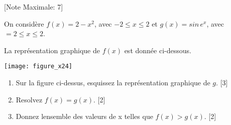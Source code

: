 \begin{question}
  \hspace*{\fill} [Note Maximale: 7]\par
  \medskip
  \noindent On considère $f(x) = 2 - x^2$, avec $-2 \le x \le 2$ et $g(x)= sin\,e^x$, avec $=2 \le x \le 2$.\par
  \medskip
  \begin{center} %
    \noindent La représentation graphique de $f(x)$ est donnée ci-dessous.\par
    \texttt{[image: figure\_x24]}\par
  \end{center} %
  \begin{enumerate}[label=(\alph*)]
    \item Sur la figure ci-dessus, esquissez la représentation graphique de $g$.\hspace*{\fill} [3]
    \item Resolvez $f(x) = g(x)$.\hspace*{\fill} [2]
    \item Donnez lensemble des valeurs de x telles que $f(x) > g(x)$.\hspace*{\fill} [2]
  \end{enumerate}
\end{question}
